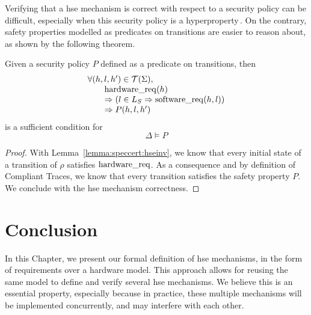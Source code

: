 Verifying that a \ac{hse} mechanism is correct with respect to a security policy
can be difficult, especially when this security policy is a
hyperproperty\,\cite{clarkson2010hyperproperties}.
%
On the contrary, safety properties modelled as predicates on transitions are
easier to reason about, as shown by the following theorem. 

\begin{theorem}
  \label{theorem:speccert:correcthse}
  Given a security policy $P$ defined as a predicate on transitions, then
  \[
    \begin{array}{l}
      \forall (h, l, h') \in \mathcal{T}(\Sigma), \\
      \qquad \mathrm{hardware\_req}(h) \\
      \qquad \Rightarrow (l \in L_{S} \Rightarrow \mathrm{software\_req}(h, l))\\
      \qquad \Rightarrow P(h, l, h')
    \end{array}
  \]
  is a sufficient condition for
  \[
    \Delta \models P
  \]

  \begin{proof}
    With Lemma~\ref{lemma:speccert:hseinv}, we know that every initial state of
    a transition of $\rho$ satisfies $\mathrm{hardware\_req}$.
    As a consequence and by definition of Compliant Traces, we know that every
    transition satisfies the safety property $P$.
    We conclude with the \ac{hse} mechanism correctness.
  \end{proof}
\end{theorem}


\section{Conclusion}

In this Chapter, we present our formal definition of \ac{hse} mechanisms, in the
form of requirements over a hardware model.
%
This approach allows for reusing the same model to define and verify several
\ac{hse} mechanisms.
%
We believe this is an essential property, especially because in practice, these
multiple mechanisms will be implemented concurrently, and may interfere with
each other.

